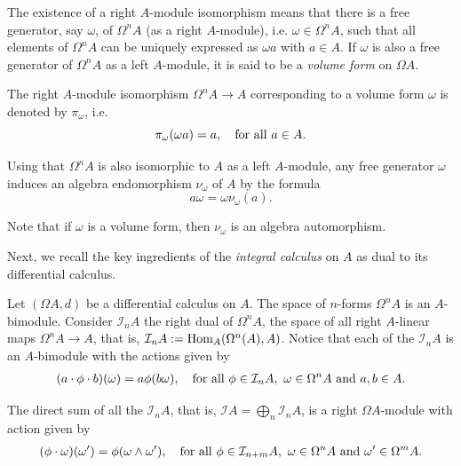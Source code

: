 \documentclass{amsart}
\theoremstyle{definition}
\theoremstyle{remark}
\numberwithin{equation}{section}
\begin{document}
The existence of a right $A$-module isomorphism means that there is a free generator, say $\omega$, of $\Omega^n A$ (as a right $A$-module), i.e. $\omega \in \Omega^n A$, such that all elements of $\Omega^n A$ can be uniquely expressed as $\omega a$ with $a \in A$. If $\omega$ is also a free generator of $\Omega^n A$ as a left $A$-module, it is said to be a {\em volume form} on $\Omega A$.

The right $A$-module isomorphism $\Omega^n A \to A$ corresponding to a volume form $\omega$ is denoted by $\pi_{\omega}$, i.e.
\begin{equation}\label{BrzezinskiSitarz2017(2.1)}
\pi_{\omega} (\omega a) = a, \quad {\rm for\ all}\ a\in A.
\end{equation}

Using that $\Omega^n A$ is also isomorphic to $A$ as a left $A$-module, any free generator $\omega $ induces an algebra endomorphism $\nu_{\omega}$ of $A$ by the formula
\begin{equation}\label{BrzezinskiSitarz2017(2.2)}
    a \omega = \omega \nu_{\omega} (a).
\end{equation}

Note that if $\omega$ is a volume form, then $\nu_{\omega}$ is an algebra automorphism.

Next, we recall the key ingredients of the {\em integral calculus} on $A$ as dual to its differential calculus. 

Let $(\Omega A, d)$ be a differential calculus on $A$. The space of $n$-forms $\Omega^n A$ is an $A$-bimodule. Consider $\mathcal{I}_{n}A$ the right dual of $\Omega^{n}A$, the space of all right $A$-linear maps $\Omega^{n}A\rightarrow A$, that is, $\mathcal{I}_{n}A := {\rm Hom}_{A}(\Omega^{n}(A),A)$. Notice that each of the $\mathcal{I}_{n}A$ is an $A$-bimodule with the actions given by
\begin{align*}
    (a\cdot\phi\cdot b)(\omega)=a\phi(b\omega),\quad {\rm for\ all}\ \phi \in \mathcal{I}_{n}A,\ \omega \in \Omega^{n}A\ {\rm and}\ a,b \in A.
\end{align*}

The direct sum of all the $\mathcal{I}_{n}A$, that is, $\mathcal{I}A = \bigoplus_{n} \mathcal{I}_n A$, is a right $\Omega A$-module with action given by
\begin{align}\label{BrzezinskiSitarz2017(2.3)}
    (\phi\cdot\omega)(\omega')=\phi(\omega\wedge\omega'),\quad {\rm for\ all}\ \phi\in\mathcal{I}_{n + m}A, \ \omega\in \Omega^{n}A \ {\rm and} \ \omega' \in \Omega^{m}A.
\end{align}
\end{document}
